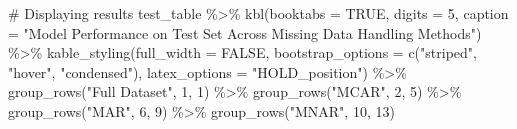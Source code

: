 \documentclass[
  letterpaper,
  DIV=11,
  numbers=noendperiod]{scrartcl}
\newenvironment{Shaded}{\begin{snugshade}}{\end{snugshade}}
\newcommand{\AttributeTok}[1]{\textcolor[rgb]{0.40,0.45,0.13}{#1}}
\newcommand{\CommentTok}[1]{\textcolor[rgb]{0.37,0.37,0.37}{#1}}
\newcommand{\ConstantTok}[1]{\textcolor[rgb]{0.56,0.35,0.01}{#1}}
\newcommand{\DecValTok}[1]{\textcolor[rgb]{0.68,0.00,0.00}{#1}}
\newcommand{\FunctionTok}[1]{\textcolor[rgb]{0.28,0.35,0.67}{#1}}
\newcommand{\NormalTok}[1]{\textcolor[rgb]{0.00,0.23,0.31}{#1}}
\newcommand{\SpecialCharTok}[1]{\textcolor[rgb]{0.37,0.37,0.37}{#1}}
\newcommand{\StringTok}[1]{\textcolor[rgb]{0.13,0.47,0.30}{#1}}
\begin{document}
\begin{Shaded}
\begin{Highlighting}[]
\CommentTok{\# Displaying results}
\NormalTok{test\_table }\SpecialCharTok{\%\textgreater{}\%}
  \FunctionTok{kbl}\NormalTok{(}\AttributeTok{booktabs =} \ConstantTok{TRUE}\NormalTok{, }\AttributeTok{digits =} \DecValTok{5}\NormalTok{, }
      \AttributeTok{caption =} \StringTok{"Model Performance on Test Set Across Missing Data Handling Methods"}\NormalTok{) }\SpecialCharTok{\%\textgreater{}\%}
  \FunctionTok{kable\_styling}\NormalTok{(}\AttributeTok{full\_width =} \ConstantTok{FALSE}\NormalTok{, }
                \AttributeTok{bootstrap\_options =} \FunctionTok{c}\NormalTok{(}\StringTok{"striped"}\NormalTok{, }\StringTok{"hover"}\NormalTok{, }\StringTok{"condensed"}\NormalTok{), }
                \AttributeTok{latex\_options =} \StringTok{"HOLD\_position"}\NormalTok{) }\SpecialCharTok{\%\textgreater{}\%}
  \FunctionTok{group\_rows}\NormalTok{(}\StringTok{"Full Dataset"}\NormalTok{, }\DecValTok{1}\NormalTok{, }\DecValTok{1}\NormalTok{) }\SpecialCharTok{\%\textgreater{}\%}
  \FunctionTok{group\_rows}\NormalTok{(}\StringTok{"MCAR"}\NormalTok{, }\DecValTok{2}\NormalTok{, }\DecValTok{5}\NormalTok{) }\SpecialCharTok{\%\textgreater{}\%}
  \FunctionTok{group\_rows}\NormalTok{(}\StringTok{"MAR"}\NormalTok{, }\DecValTok{6}\NormalTok{, }\DecValTok{9}\NormalTok{) }\SpecialCharTok{\%\textgreater{}\%}
  \FunctionTok{group\_rows}\NormalTok{(}\StringTok{"MNAR"}\NormalTok{, }\DecValTok{10}\NormalTok{, }\DecValTok{13}\NormalTok{)}
\end{Highlighting}
\end{Shaded}
\end{document}
